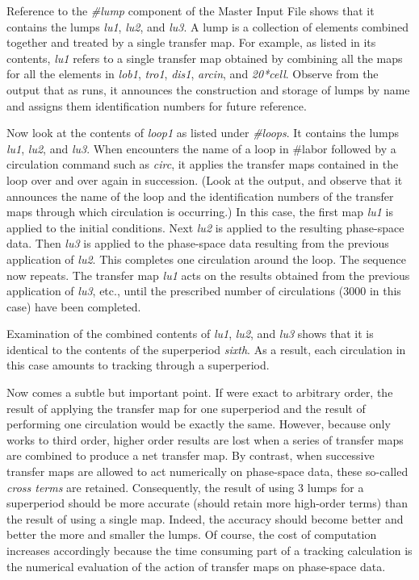      Reference to the {\em \#lump} component of the \Mary Master Input File
shows that it contains the lumps {\em lu1}, {\em lu2}, and {\em lu3}.  A lump is a collection of elements combined together and treated by a single transfer map.  For
example, as listed in its contents, {\em lu1 } refers to a single transfer map
obtained by combining all the maps for all the elements in {\em lob1}, {\em tro1},
{\em dis1}, {\em arcin}, and {\em 20*cell}.  Observe from the output that as \Mary runs, it announces the construction and storage of lumps by name and assigns them
identification numbers for future reference.

     Now look at the contents of {\em loop1 } as listed under {\em \#loops}.  It contains
the lumps {\em lu1}, {\em lu2}, and {\em lu3}.  When \Mary encounters the name of a loop in \#labor followed by a circulation command such as {\em circ}, it applies the
transfer maps contained in the loop over and over again in succession.
(Look at the \Mary output, and observe that it announces the name of the
loop and the identification numbers of the transfer maps through which
circulation is occurring.)  In this case, the first map {\em lu1 } is applied to
the initial conditions.  Next {\em lu2 } is applied to the resulting phase-space
data.  Then {\em lu3 } is applied to the phase-space data resulting from the
previous application of {\em lu2}.  This completes one circulation around the
loop.  The sequence now repeats.  The transfer map {\em lu1 } acts on the results
obtained from the previous application of {\em lu3}, etc., until the prescribed
number of circulations (3000 in this case) have been completed.

     Examination of the combined contents  of {\em lu1}, {\em lu2}, and {\em lu3} shows that it is identical to the contents of the superperiod {\em sixth}.  As a result,
each circulation in this case amounts to tracking through a superperiod.

     Now comes a subtle but important point.  If  were exact to
arbitrary order, the result of applying the transfer map for one
superperiod and the result of performing one circulation would be exactly
the same. However, because  only works to third order, higher
order results are lost when a series of transfer maps are combined to
produce a net transfer map.  By contrast, when successive transfer maps are
allowed to act numerically on phase-space data, these so-called {\em cross terms}
are retained. Consequently, the result of using 3 lumps for a superperiod
should be more accurate (should retain more high-order terms) than the
result of using a single map.  Indeed, the accuracy should become better
and better the more and smaller the lumps.  Of course, the cost of
computation increases accordingly because the time consuming part of a
tracking calculation is the numerical evaluation of the action of transfer
maps on phase-space data.


